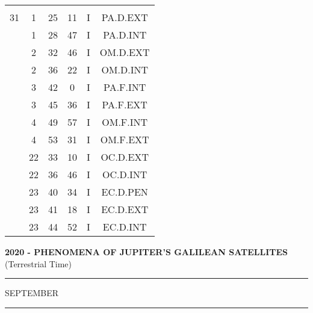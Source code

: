 \documentclass[12pt, a4paper]{article}
\begin{document}
\begin{multicols}{3}
{\begin{tabular}{c c c c c c}
	 	 	 	 & & & & & \\%
	 	 	 	31 & 1 & 25 & 11 & I & PA.D.EXT\\%
	 	 	 	 & 1 & 28 & 47 & I & PA.D.INT\\%
	 	 	 	 & 2 & 32 & 46 & I & OM.D.EXT\\%
	 	 	 	 & 2 & 36 & 22 & I & OM.D.INT\\%
	 	 	 	 & 3 & 42 & 0 & I & PA.F.INT\\%
	 	 	 	 & 3 & 45 & 36 & I & PA.F.EXT\\%
	 	 	 	 & 4 & 49 & 57 & I & OM.F.INT\\%
	 	 	 	 & 4 & 53 & 31 & I & OM.F.EXT\\%
	 	 	 	 & 22 & 33 & 10 & I & OC.D.EXT\\%
	 	 	 	 & 22 & 36 & 46 & I & OC.D.INT\\%
	 	 	 	 & 23 & 40 & 34 & I & EC.D.PEN\\%
	 	 	 	 & 23 & 41 & 18 & I & EC.D.EXT\\%
	 	 	 	 & 23 & 44 & 52 & I & EC.D.INT\\%
	 	 \end{tabular}
 	}
\end{multicols}
\textbf{2020 - PHENOMENA OF JUPITER'S GALILEAN SATELLITES}\\(Terrestrial Time) 
\vspace{0.1cm} \hrule \vspace{0.1cm}
SEPTEMBER\vspace{0.1cm}
\hrule
\vspace{-0.2cm}
\end{document}
